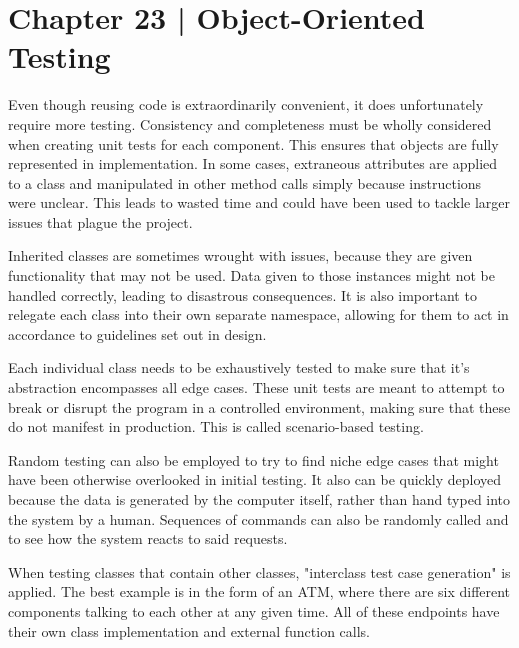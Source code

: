 \documentclass{article}
\begin{document}
\section{Chapter 23 | Object-Oriented Testing}

Even though reusing code is extraordinarily convenient, it does unfortunately require more testing.
Consistency and completeness must be wholly considered when creating unit tests for each component.
This ensures that objects are fully represented in implementation.
In some cases, extraneous attributes are applied to a class and manipulated in other method calls simply because instructions were unclear.
This leads to wasted time and could have been used to tackle larger issues that plague the project.

Inherited classes are sometimes wrought with issues, because they are given functionality that may not be used.
Data given to those instances might not be handled correctly, leading to disastrous consequences.
It is also important to relegate each class into their own separate namespace, allowing for them to act in accordance to guidelines set out in design.

Each individual class needs to be exhaustively tested to make sure that it's abstraction encompasses all edge cases.
These unit tests are meant to attempt to break or disrupt the program in a controlled environment, making sure that these do not manifest in production.
This is called scenario-based testing.

Random testing can also be employed to try to find niche edge cases that might have been otherwise overlooked in initial testing.
It also can be quickly deployed because the data is generated by the computer itself, rather than hand typed into the system by a human.
Sequences of commands can also be randomly called and to see how the system reacts to said requests.

When testing classes that contain other classes, "interclass test case generation" is applied.
The best example is in the form of an ATM, where there are six different components talking to each other at any given time.
All of these endpoints have their own class implementation and external function calls.
\end{document}
